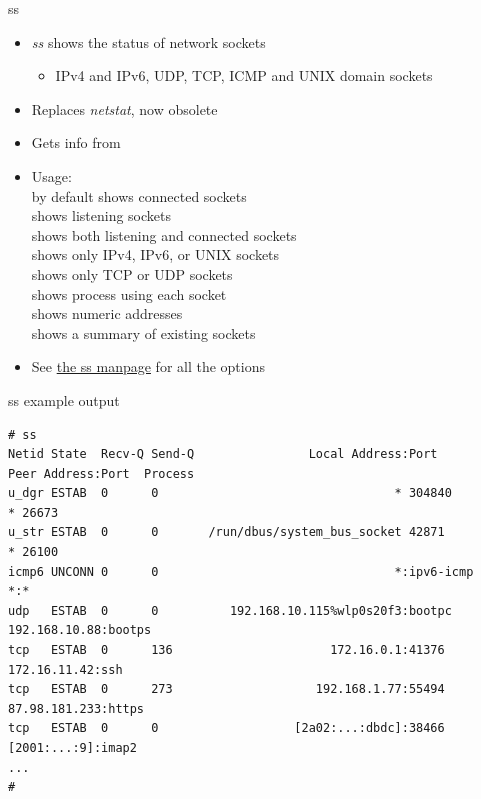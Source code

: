 \begin{frame}{ss}
  \begin{itemize}
  \item {\em ss} shows the status of network sockets
    \begin{itemize}
    \item IPv4 and IPv6, UDP, TCP, ICMP and UNIX domain sockets
    \end{itemize}
  \item Replaces {\em netstat}, now obsolete
  \item Gets info from 
  \item Usage:\\
     by default shows connected sockets\\
     shows listening sockets\\
     shows both listening and connected sockets\\
     shows only IPv4, IPv6, or UNIX sockets\\
     shows only TCP or UDP sockets\\
     shows process using each socket\\
     shows numeric addresses\\
     shows a summary of existing sockets
    \item See
      \href{https://www.man7.org/linux/man-pages/man8/ss.8.html}{the ss
        manpage} for all the options
  \end{itemize}
\end{frame}

\begin{frame}[fragile]{ss example output}
    \begin{block}{}
      \begin{verbatim}
# ss
Netid State  Recv-Q Send-Q                Local Address:Port            Peer Address:Port  Process
u_dgr ESTAB  0      0                                 * 304840                     * 26673
u_str ESTAB  0      0       /run/dbus/system_bus_socket 42871                      * 26100
icmp6 UNCONN 0      0                                 *:ipv6-icmp                  *:*
udp   ESTAB  0      0          192.168.10.115%wlp0s20f3:bootpc         192.168.10.88:bootps
tcp   ESTAB  0      136                      172.16.0.1:41376           172.16.11.42:ssh
tcp   ESTAB  0      273                    192.168.1.77:55494          87.98.181.233:https
tcp   ESTAB  0      0                   [2a02:...:dbdc]:38466     [2001:...:9]:imap2
...
#
      \end{verbatim}
    \end{block}
\end{frame}


